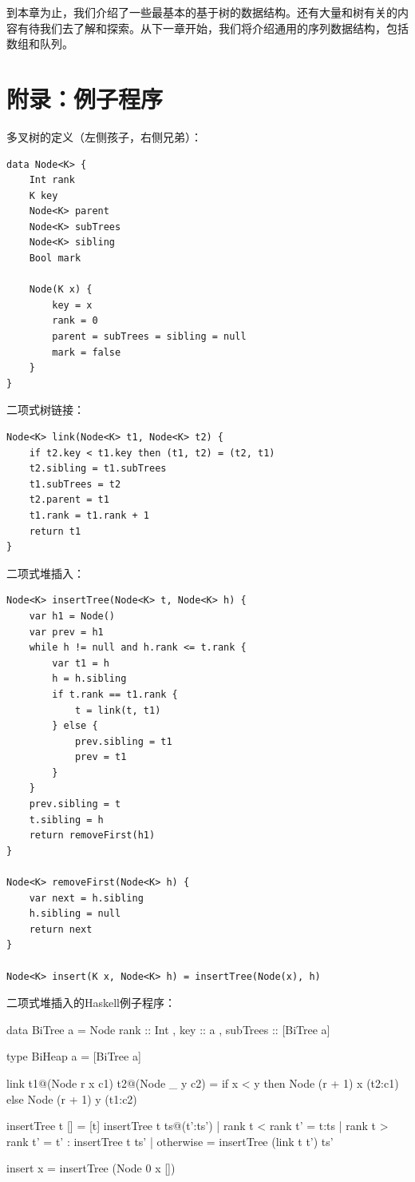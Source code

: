 \documentclass[b5paper]{ctexart}
\begin{document}
到本章为止，我们介绍了一些最基本的基于树的数据结构。还有大量和树有关的内容有待我们去了解和探索。从下一章开始，我们将介绍通用的序列数据结构，包括数组和队列。

\section{附录：例子程序}

多叉树的定义（左侧孩子，右侧兄弟）：

\begin{lstlisting}[language = Bourbaki]
data Node<K> {
    Int rank
    K key
    Node<K> parent
    Node<K> subTrees
    Node<K> sibling
    Bool mark

    Node(K x) {
        key = x
        rank = 0
        parent = subTrees = sibling = null
        mark = false
    }
}
\end{lstlisting}

二项式树链接：

\begin{lstlisting}[language = Bourbaki]
Node<K> link(Node<K> t1, Node<K> t2) {
    if t2.key < t1.key then (t1, t2) = (t2, t1)
    t2.sibling = t1.subTrees
    t1.subTrees = t2
    t2.parent = t1
    t1.rank = t1.rank + 1
    return t1
}
\end{lstlisting}

二项式堆插入：

\begin{lstlisting}[language = Bourbaki]
Node<K> insertTree(Node<K> t, Node<K> h) {
    var h1 = Node()
    var prev = h1
    while h != null and h.rank <= t.rank {
        var t1 = h
        h = h.sibling
        if t.rank == t1.rank {
            t = link(t, t1)
        } else {
            prev.sibling = t1
            prev = t1
        }
    }
    prev.sibling = t
    t.sibling = h
    return removeFirst(h1)
}

Node<K> removeFirst(Node<K> h) {
    var next = h.sibling
    h.sibling = null
    return next
}

Node<K> insert(K x, Node<K> h) = insertTree(Node(x), h)
\end{lstlisting}

二项式堆插入的Haskell例子程序：

\begin{Haskell}
data BiTree a = Node { rank :: Int
                     , key :: a
                     , subTrees :: [BiTree a]}

type BiHeap a = [BiTree a]

link t1@(Node r x c1) t2@(Node _ y c2) =
    if x < y then Node (r + 1) x (t2:c1)
    else Node (r + 1) y (t1:c2)

insertTree t [] = [t]
insertTree t ts@(t':ts') | rank t < rank t' = t:ts
                         | rank t > rank t' = t' : insertTree t ts'
                         | otherwise = insertTree (link t t') ts'

insert x = insertTree (Node 0 x [])
\end{Haskell}
\end{document}
